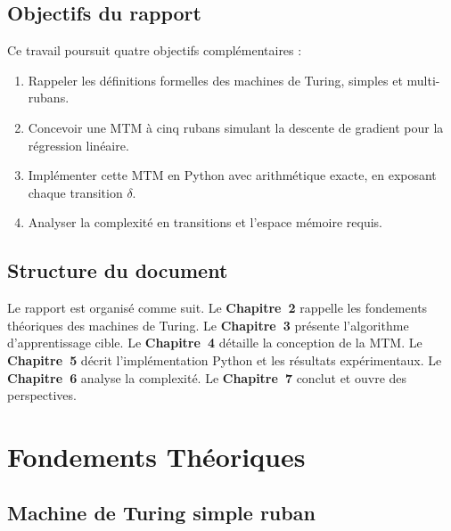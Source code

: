 \documentclass[12pt, a4paper, oneside]{report}
\begin{document}
\section{Objectifs du rapport}

Ce travail poursuit quatre objectifs complémentaires :

\begin{enumerate}[leftmargin=*, label=\textbf{O\arabic*.}]
  \item Rappeler les définitions formelles des machines de Turing, simples et multi-rubans.
  \item Concevoir une MTM à cinq rubans simulant la descente de gradient pour la régression linéaire.
  \item Implémenter cette MTM en Python avec arithmétique exacte, en exposant chaque transition $\delta$.
  \item Analyser la complexité en transitions et l'espace mémoire requis.
\end{enumerate}

\section{Structure du document}

Le rapport est organisé comme suit. Le \textbf{Chapitre~2} rappelle les fondements théoriques des machines de Turing. Le \textbf{Chapitre~3} présente l'algorithme d'apprentissage cible. Le \textbf{Chapitre~4} détaille la conception de la MTM. Le \textbf{Chapitre~5} décrit l'implémentation Python et les résultats expérimentaux. Le \textbf{Chapitre~6} analyse la complexité. Le \textbf{Chapitre~7} conclut et ouvre des perspectives.

\chapter{Fondements Théoriques}

\section{Machine de Turing simple ruban}
\end{document}
